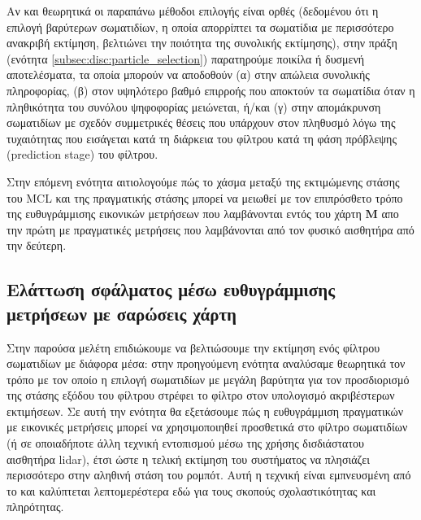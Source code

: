Αν και θεωρητικά οι παραπάνω μέθοδοι επιλογής είναι ορθές (δεδομένου ότι η
επιλογή βαρύτερων σωματιδίων, η οποία απορρίπτει τα σωματίδια με περισσότερο
ανακριβή εκτίμηση, βελτιώνει την ποιότητα της συνολικής εκτίμησης), στην πράξη
(ενότητα \ref{subsec:disc:particle_selection}) παρατηρούμε ποικίλα ή δυσμενή
αποτελέσματα, τα οποία μπορούν να αποδοθούν (α) στην απώλεια συνολικής
πληροφορίας, (β) στον υψηλότερο βαθμό επιρροής που αποκτούν τα σωματίδια όταν η
πληθικότητα του συνόλου ψηφοφορίας μειώνεται, ή/και (γ) στην απομάκρυνση
σωματιδίων με σχεδόν συμμετρικές θέσεις που υπάρχουν στον πληθυσμό λόγω της
τυχαιότητας που εισάγεται κατά τη διάρκεια του φίλτρου κατά τη φάση πρόβλεψης
(prediction stage) του φίλτρου.

Στην επόμενη ενότητα αιτιολογούμε πώς το χάσμα μεταξύ της εκτιμώμενης στάσης
του MCL και της πραγματικής στάσης μπορεί να μειωθεί με τον επιπρόσθετο τρόπο
της ευθυγράμμισης εικονικών μετρήσεων που λαμβάνονται εντός του χάρτη $\bm{M}$
απο την πρώτη με πραγματικές μετρήσεις που λαμβάνονται από τον φυσικό
αισθητήρα από την δεύτερη.

\subsection{Ελάττωση σφάλματος μέσω ευθυγράμμισης μετρήσεων με σαρώσεις χάρτη}

Στην παρούσα μελέτη επιδιώκουμε να βελτιώσουμε την εκτίμηση ενός φίλτρου
σωματιδίων με διάφορα μέσα: στην προηγούμενη ενότητα αναλύσαμε θεωρητικά τον
τρόπο με τον οποίο η επιλογή σωματιδίων με μεγάλη βαρύτητα για τον προσδιορισμό
της στάσης εξόδου του φίλτρου στρέφει το φίλτρο στον υπολογισμό ακριβέστερων
εκτιμήσεων.  Σε αυτή την ενότητα θα εξετάσουμε πώς η ευθυγράμμιση πραγματικών
με εικονικές μετρήσεις μπορεί να χρησιμοποιηθεί προσθετικά στο φίλτρο
σωματιδίων (ή σε οποιαδήποτε άλλη τεχνική εντοπισμού μέσω της χρήσης
δισδιάστατου αισθητήρα lidar), έτσι ώστε η τελική εκτίμηση του συστήματος να
πλησιάζει περισσότερο στην αληθινή στάση του ρομπότ.  Αυτή η τεχνική είναι
εμπνευσμένη από το \cite{Vasiljevic2016b} και καλύπτεται λεπτομερέστερα εδώ για
τους σκοπούς σχολαστικότητας και πληρότητας.

